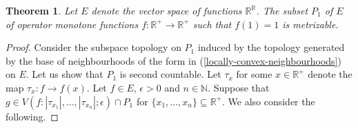 \documentclass[12pt,a4paper]{amsart}
\newtheorem{theorem}{Theorem}
\theoremstyle{definition}
\newcommand{\myabs}[1]{ | #1 | }
\begin{document}
	\begin{theorem}
		Let $E$ denote the vector space of functions $\mathbb{R}^{\mathbb{R}}$. The subset $P_1$ of $E$ of operator monotone functions $f: \mathbb{R}^{+} \rightarrow \mathbb{R}^{+}$ such that $f(1) = 1$ is metrizable.
	\end{theorem}
	\begin{proof}
		Consider the subspace topology on $P_1$ induced by the topology generated by the base of neighbourhoods of the form in  (\ref{locally-convex-neighbourhoods}) on $E$. Let us show that $P_1$ is second countable. Let $\tau_x$ for some $x \in \mathbb{R}^{+}$ denote the map $\tau_{x}: f \rightarrow f(x)$. Let $f \in E$, $\epsilon > 0$ and  $n \in \mathbb{N}$. Suppose that $g \in V(f: \myabs{\tau_{x_1}}, \ldots, \myabs{\tau_{x_n}};  \epsilon) \cap P_1$ for $\lbrace x_1, \ldots, x_n \rbrace \subseteq \mathbb{R}^{+}$. We also consider the following.
		

\end{proof}
\end{document}
